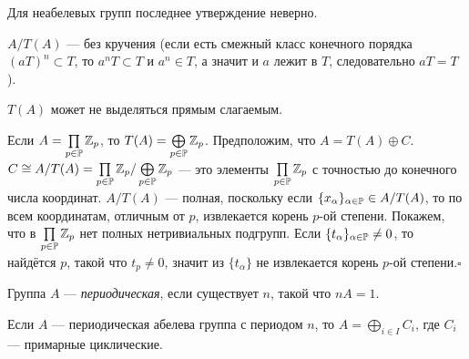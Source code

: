 \documentclass[10pt,a4paper]{article}%
\begin{document}
\begin{note}
Для неабелевых групп последнее утверждение неверно.
\end{note}

$A/T(A)$ --- без кручения (если есть смежный класс конечного
порядка $(aT)^n\subset T$, то $a^nT\subset T$ и $a^n\in T$, а
значит и $a$ лежит в $T$, следовательно $aT=T$).

\begin{ex}
$T(A)$ может не выделяться прямым слагаемым.

Если $A=\prod\limits_{p\in\mathbb P}\mathbb Z_p$, то
$T(A)=\bigoplus\limits_{p\in\mathbb P}\mathbb Z_p$. Предположим, что
$A=T(A)\oplus C$. $C\cong
A/T(A)=\prod\limits_{p\in\mathbb P}\mathbb Z_p/\bigoplus\limits_{p\in\mathbb P}\mathbb Z_p$
--- это элементы $\prod\limits_{p\in\mathbb P}\mathbb Z_p$ с точностью до
конечного числа координат. $A/T(A)$ --- полная, поскольку если
$\{x_\alpha\}_{\alpha\in\mathbb P}\in A/T(A)$, то по всем координатам,
отличным от $p$, извлекается корень $p$-ой степени. Покажем, что в
$\prod\limits_{p\in\mathbb P}\mathbb Z_p$ нет полных нетривиальных подгрупп.
Если $\{t_\alpha\}_{\alpha\in\mathbb P}\ne 0$, то найдётся $p$, такой
что $t_p\ne 0$, значит из $\{t_\alpha\}$ не извлекается корень
$p$-ой степени.$\square$
\end{ex}

Группа $A$ --- {\em периодическая},
если существует $n$, такой что $nA=1$.

\begin{theorem}Если $A$ --- периодическая абелева группа
с периодом $n$, то $A=\bigoplus\limits_{i\in I}C_i$, где $C_i$
--- примарные циклические.
\end{theorem}
\end{document}

